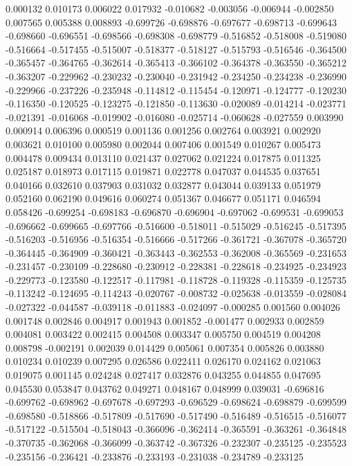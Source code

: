 0.000132
0.010173
0.006022
0.017932
-0.010682
-0.003056
-0.006944
-0.002850
0.007565
0.005388
0.008893
-0.699726
-0.698876
-0.697677
-0.698713
-0.699643
-0.698660
-0.696551
-0.698566
-0.698308
-0.698779
-0.516852
-0.518008
-0.519080
-0.516664
-0.517455
-0.515007
-0.518377
-0.518127
-0.515793
-0.516546
-0.364500
-0.365457
-0.364765
-0.362614
-0.365413
-0.366102
-0.364378
-0.363550
-0.365212
-0.363207
-0.229962
-0.230232
-0.230040
-0.231942
-0.234250
-0.234238
-0.236990
-0.229966
-0.237226
-0.235948
-0.114812
-0.115454
-0.120971
-0.124777
-0.120230
-0.116350
-0.120525
-0.123275
-0.121850
-0.113630
-0.020089
-0.014214
-0.023771
-0.021391
-0.016068
-0.019902
-0.016080
-0.025714
-0.060628
-0.027559
0.003990
0.000914
0.006396
0.000519
0.001136
0.001256
0.002764
0.003921
0.002920
0.003621
0.010100
0.005980
0.002044
0.007406
0.001549
0.010267
0.005473
0.004478
0.009434
0.013110
0.021437
0.027062
0.021224
0.017875
0.011325
0.025187
0.018973
0.017115
0.019871
0.022778
0.047037
0.044535
0.037651
0.040166
0.032610
0.037903
0.031032
0.032877
0.043044
0.039133
0.051979
0.052160
0.062190
0.049616
0.060274
0.051367
0.046677
0.051171
0.046594
0.058426
-0.699254
-0.698183
-0.696870
-0.696904
-0.697062
-0.699531
-0.699053
-0.696662
-0.699665
-0.697766
-0.516600
-0.518011
-0.515029
-0.516245
-0.517395
-0.516203
-0.516956
-0.516354
-0.516666
-0.517266
-0.361721
-0.367078
-0.365720
-0.364445
-0.364909
-0.360421
-0.363443
-0.362553
-0.362008
-0.365569
-0.231653
-0.231457
-0.230109
-0.228680
-0.230912
-0.228381
-0.228618
-0.234925
-0.234923
-0.229773
-0.123580
-0.122517
-0.117981
-0.118728
-0.119328
-0.115359
-0.125735
-0.113242
-0.124695
-0.114243
-0.020767
-0.008732
-0.025638
-0.013559
-0.028084
-0.027322
-0.044587
-0.039118
-0.011883
-0.024097
-0.000285
0.001560
0.004026
0.001748
0.002846
0.004917
0.001943
0.001852
-0.001477
0.002933
0.002859
0.004081
0.003422
0.002415
0.004508
0.003347
0.005750
0.004519
0.004208
0.008798
-0.002191
0.002039
0.014429
0.005061
0.007354
0.005826
0.003880
0.010234
0.010239
0.007295
0.026586
0.022411
0.026170
0.024162
0.021063
0.019075
0.001145
0.024248
0.027417
0.032876
0.043255
0.044855
0.047695
0.045530
0.053847
0.043762
0.049271
0.048167
0.048999
0.039031
-0.696816
-0.699762
-0.698962
-0.697678
-0.697293
-0.696529
-0.698624
-0.698879
-0.699599
-0.698580
-0.518866
-0.517809
-0.517690
-0.517490
-0.516489
-0.516515
-0.516077
-0.517122
-0.515504
-0.518043
-0.366096
-0.362414
-0.365591
-0.363261
-0.364848
-0.370735
-0.362068
-0.366099
-0.363742
-0.367326
-0.232307
-0.235125
-0.235523
-0.235156
-0.236421
-0.233876
-0.233193
-0.231038
-0.234789
-0.233125
